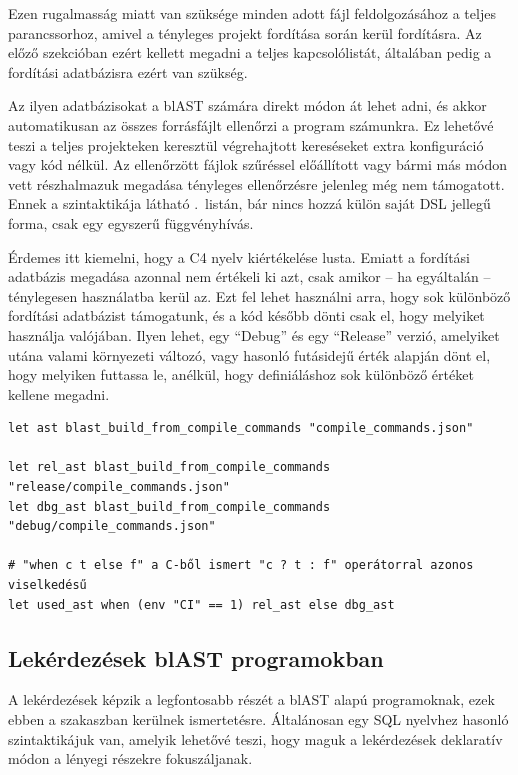Ezen rugalmasság miatt van szüksége minden adott fájl feldolgozásához a teljes parancssorhoz, amivel a tényleges projekt fordítása során kerül fordításra.
Az előző szekcióban ezért kellett megadni a teljes kapcsolólistát, általában pedig a fordítási adatbázisra ezért van szükség.

Az ilyen adatbázisokat a blAST számára direkt módon át lehet adni, és akkor automatikusan az összes forrásfájlt ellenőrzi a program számunkra.
Ez lehetővé teszi a teljes projekteken keresztül végrehajtott kereséseket extra konfiguráció vagy kód nélkül.
Az ellenőrzött fájlok szűréssel előállított vagy bármi más módon vett részhalmazuk megadása tényleges ellenőrzésre jelenleg még nem támogatott.
Ennek a szintaktikája látható .~listán, bár nincs hozzá külön saját \gls{DSL} jellegű forma, csak egy egyszerű függvényhívás.

Érdemes itt kiemelni, hogy a C4 nyelv kiértékelése lusta.
Emiatt a fordítási adatbázis megadása azonnal nem értékeli ki azt, csak amikor -- ha egyáltalán -- ténylegesen használatba kerül az.
Ezt fel lehet használni arra, hogy sok különböző fordítási adatbázist támogatunk, és a kód később dönti csak el, hogy melyiket használja valójában.
Ilyen lehet, \pl egy ``Debug'' és egy ``Release'' verzió, amelyiket utána valami környezeti változó, vagy hasonló futásidejű érték alapján dönt el, hogy melyiken futtassa le, anélkül, hogy definiáláshoz sok különböző értéket kellene megadni.

\begin{lstlisting}[caption={Fordítási adatbázis megadása},label=lst:blast-compdb]
let ast blast_build_from_compile_commands "compile_commands.json"

let rel_ast blast_build_from_compile_commands "release/compile_commands.json"
let dbg_ast blast_build_from_compile_commands "debug/compile_commands.json"

# "when c t else f" a C-ből ismert "c ? t : f" operátorral azonos viselkedésű
let used_ast when (env "CI" == 1) rel_ast else dbg_ast
\end{lstlisting}

\subsection{Lekérdezések blAST programokban}

A lekérdezések képzik a legfontosabb részét a blAST alapú programoknak, ezek ebben a szakaszban kerülnek ismertetésre.
Általánosan egy SQL nyelvhez hasonló szintaktikájuk van, amelyik lehetővé teszi, hogy maguk a lekérdezések deklaratív módon a lényegi részekre fokuszáljanak.

